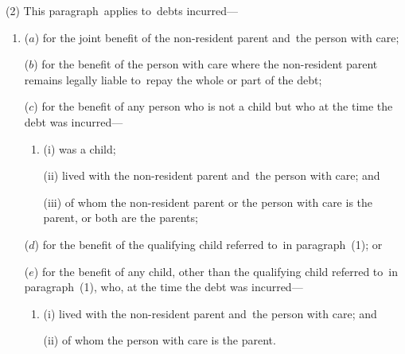 \documentclass[12pt,a4paper]{article}
\begin{document}
(2) This paragraph~applies to~debts incurred—
\begin{enumerate}\item[]
($a$) for the joint benefit of the non-resident parent and~the person with care;

($b$) for the benefit of the person with care where the non-resident parent remains legally liable to~repay the whole or part of the debt;

($c$) for the benefit of any person who is not a child but who at the time the debt was incurred—
\begin{enumerate}\item[]
(i) was a child;

(ii) lived with the non-resident parent and~the person with care; and

(iii) of whom the non-resident parent or the person with care is the parent, or both are the parents;
\end{enumerate}

($d$) for the benefit of the qualifying child referred to~in paragraph~(1); or

($e$) for the benefit of any child, other than the qualifying child referred to~in paragraph~(1), who, at the time the debt was incurred—
\begin{enumerate}\item[]
(i) lived with the non-resident parent and~the person with care; and

(ii) of whom the person with care is the parent.
\end{enumerate}
\end{enumerate}
\end{document}
